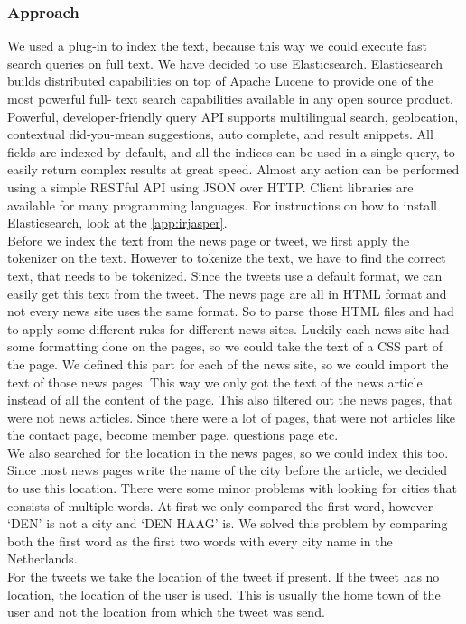 \subsubsection*{Approach}
We used a plug-in to index the text, because this way we could execute fast search queries on full text. 
We have decided to use Elasticsearch. 
Elasticsearch builds distributed capabilities on top of Apache Lucene to provide one of the most powerful full- text search capabilities available in any open source product. 
Powerful, developer-friendly query API supports multilingual search, geolocation, contextual did-you-mean suggestions, auto complete, and result snippets.
All fields are indexed by default, and all the indices can be used in a single query, to easily return complex results at great speed.  
Almost any action can be performed using a simple RESTful API using JSON over HTTP. Client libraries are available for many programming languages.
For instructions on how to install Elasticsearch, look at the  \autoref{app:irjasper}.\\
Before we index the text from the news page or tweet, we first apply the tokenizer on the text.
However to tokenize the text, we have to find the correct text, that needs to be tokenized.
Since the tweets use a default format, we can easily get this text from the tweet. 
The news page are all in HTML format and not every news site uses the same format. 
So to parse those HTML files and had to apply some different rules for different news sites.
Luckily each news site had some formatting done on the pages, so we could take the text of a CSS part of the page. 
We defined this part for each of the news site, so we could import the text of those news pages.  
This way we only got the text of the news article instead of all the content of the page.
This also filtered out the news pages, that were not news articles. 
Since there were a lot of pages, that were not articles like the contact page, become member page, questions page etc.  \\
We also searched for the location in the news pages, so we could index this too. 
Since most news pages write the name of the city before the article, we decided to use this location.
There were some minor problems with looking for cities that consists of multiple words. 
At first we only compared the first word, however `DEN' is not a city and `DEN HAAG' is. 
We solved this problem by comparing both the first word as the first two words with every city name in the Netherlands. \\
 For the tweets we take the location of the tweet if present. 
If the tweet has no location, the location of the user is used. 
This is usually the home town of the user and not the location from which the tweet was send.\\ 

